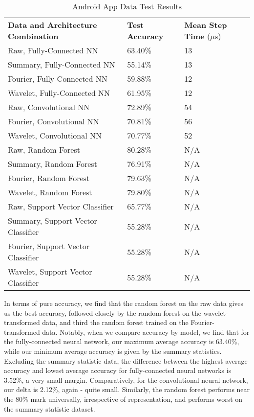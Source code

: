 \begin{table}[h]
\centering
\label{Tab:test}	
\begin{tabular}{l|ll}
\textbf{Data and Architecture Combination} & \textbf{Test Accuracy} & \textbf{Mean Step Time} ($\mu$s) \\\cline{1-3}
Raw, Fully-Connected NN            & 63.40\%         & 13\\
Summary, Fully-Connected NN        & 55.14\%         & 13\\
Fourier, Fully-Connected NN        & 59.88\%         & 12\\
Wavelet, Fully-Connected NN        & 61.95\%         & 12\\
\hline
Raw, Convolutional NN              & 72.89\%         & 54\\
Fourier, Convolutional NN          & 70.81\%         & 56\\
Wavelet, Convolutional NN          & 70.77\%         & 52\\
\hline
Raw, Random Forest                 & 80.28\%         & N/A\\ 
Summary, Random Forest             & 76.91\%         & N/A\\
Fourier, Random Forest             & 79.63\%         & N/A\\
Wavelet, Random Forest             & 79.80\%         & N/A\\
\hline
Raw, Support Vector Classifier     & 65.77\%         & N/A\\    
Summary, Support Vector Classifier & 55.28\%         & N/A\\  
Fourier, Support Vector Classifier & 55.28\%         & N/A\\  
Wavelet, Support Vector Classifier & 55.28\%         & N/A           
\end{tabular}
\caption{Android App Data Test Results}
\end{table}

In terms of pure accuracy, we find that the random forest on the raw data gives us the best accuracy, followed closely by the random forest on the wavelet-transformed data, and third the random forest trained on the Fourier-transformed data. 
Notably, when we compare accuracy by model, we find that for the fully-connected neural network, our maximum average accuracy is 63.40\%, while our minimum average accuracy is given by the summary statistics.
Excluding the summary statistic data, the difference between the highest average accuracy and lowest average accuracy for fully-connected neural networks is 3.52\%, a very small margin. 
Comparatively, for the convolutional neural network, our delta is 2.12\%, again - quite small. 
Similarly, the random forest performs near the 80\% mark universally, irrespective of representation, and performs worst on the summary statistic dataset. 
